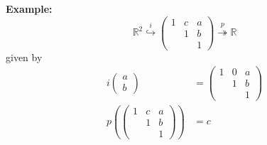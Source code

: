 \documentclass[12pt]{article}
\newcommand{\R}{\mathbb{R}}
\begin{document}
    \textbf{Example:} 
    \[\R^2 \overset{i}{\hookrightarrow} \begin{pmatrix}
        1 & c & a\\ 
        & 1 & b\\ 
        & & 1
    \end{pmatrix}\overset{p}{\twoheadrightarrow} \R\] 
    given by 
    \begin{align*}
        i\begin{pmatrix}
            a\\ b
        \end{pmatrix} &= \begin{pmatrix}
            1 & 0 & a\\ 
            & 1 & b\\ 
            & & 1
        \end{pmatrix}\\ 
        p(\begin{pmatrix}
            1 & c & a\\ 
            & 1 & b\\ 
            & & 1
        \end{pmatrix}) &= c
    \end{align*} 
\end{document}
